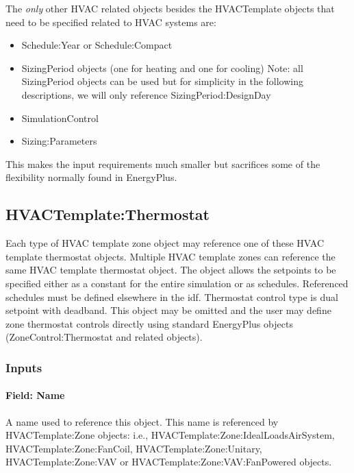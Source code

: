 The \emph{only} other HVAC related objects besides the HVACTemplate objects that need to be specified related to HVAC systems are:

\begin{itemize}
\item
  Schedule:Year or Schedule:Compact
\item
  SizingPeriod objects (one for heating and one for cooling) Note: all SizingPeriod objects can be used but for simplicity in the following descriptions, we will only reference SizingPeriod:DesignDay
\item
  SimulationControl
\item
  Sizing:Parameters
\end{itemize}

This makes the input requirements much smaller but sacrifices some of the flexibility normally found in EnergyPlus.

\subsection{HVACTemplate:Thermostat}\label{hvactemplatethermostat}

Each type of HVAC template zone object may reference one of these HVAC template thermostat objects. Multiple HVAC template zones can reference the same HVAC template thermostat object. The object allows the setpoints to be specified either as a constant for the entire simulation or as schedules. Referenced schedules must be defined elsewhere in the idf. Thermostat control type is dual setpoint with deadband. This object may be omitted and the user may define zone thermostat controls directly using standard EnergyPlus objects (ZoneControl:Thermostat and related objects).

\subsubsection{Inputs}\label{inputs-024}

\paragraph{Field: Name}\label{field-name-023}

A name used to reference this object. This name is referenced by HVACTemplate:Zone objects: i.e., HVACTemplate:Zone:IdealLoadsAirSystem, HVACTemplate:Zone:FanCoil, HVACTemplate:Zone:Unitary, HVACTemplate:Zone:VAV or HVACTemplate:Zone:VAV:FanPowered objects.


